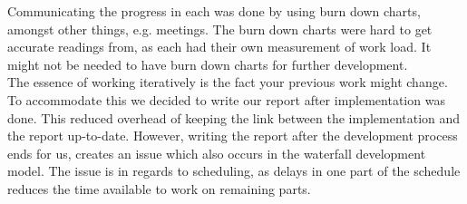 Communicating the progress in each \localgroup[] was done by using burn down charts, amongst other things, e.g. meetings.
The burn down charts were hard to get accurate readings from, as each \localgroup[] had their own measurement of work load.
It might not be needed to have burn down charts for further development. \\

The essence of working iteratively is the fact your previous work might change.
To accommodate this we decided to write our report after implementation was done. This reduced overhead of keeping the link between the implementation and the report up-to-date.
However, writing the report after the development process ends for us, creates an issue which also occurs in the  waterfall development model.
The issue is in regards to scheduling, as delays in one part of the schedule reduces the time available to work on remaining parts.

